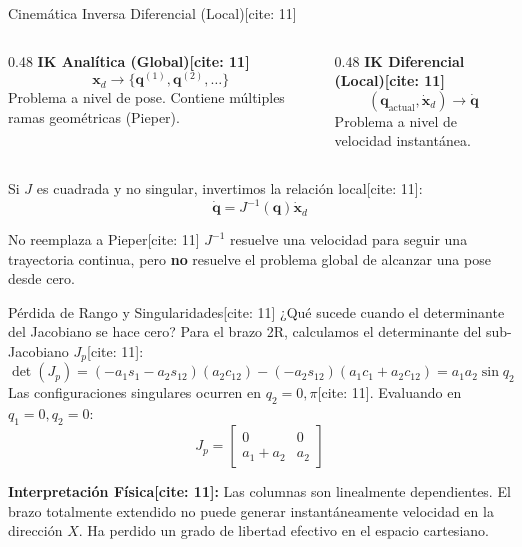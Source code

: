 \documentclass[aspectratio=169, xcolor={table,xcdraw}]{beamer}
\begin{document}
\begin{frame}{Cinemática Inversa Diferencial (Local)[cite: 11]}
    \begin{columns}[T]
        \begin{column}{0.48\textwidth}
            \textbf{IK Analítica (Global)[cite: 11]}
            \begin{equation*}
                \mathbf{x}_d \longrightarrow \{ \mathbf{q}^{(1)}, \mathbf{q}^{(2)}, \ldots \}
            \end{equation*}
            Problema a nivel de pose. Contiene múltiples ramas geométricas (Pieper).
        \end{column}
        \begin{column}{0.48\textwidth}
            \textbf{IK Diferencial (Local)[cite: 11]}
            \begin{equation*}
                ( \mathbf{q}_{\text{actual}}, \dot{\mathbf{x}}_d ) \longrightarrow \dot{\mathbf{q}}
            \end{equation*}
            Problema a nivel de velocidad instantánea.
        \end{column}
    \end{columns}
    
    \vfill
    Si $J$ es cuadrada y no singular, invertimos la relación local[cite: 11]:
    \begin{equation*}
        \boxed{\dot{\mathbf{q}} = J^{-1}(\mathbf{q})\dot{\mathbf{x}}_d}
    \end{equation*}
    
    \begin{alertblock}{No reemplaza a Pieper[cite: 11]}
        $J^{-1}$ resuelve una velocidad para seguir una trayectoria continua, pero \textbf{no} resuelve el problema global de alcanzar una pose desde cero.
    \end{alertblock}
\end{frame}

\begin{frame}{Pérdida de Rango y Singularidades[cite: 11]}
    ¿Qué sucede cuando el determinante del Jacobiano se hace cero?
    Para el brazo 2R, calculamos el determinante del sub-Jacobiano $J_p$[cite: 11]:
    \begin{equation*}
        \det(J_p) = (-a_1 s_1 - a_2 s_{12})(a_2 c_{12}) - (-a_2 s_{12})(a_1 c_1 + a_2 c_{12}) = \boxed{a_1 a_2 \sin q_2}
    \end{equation*}
    Las configuraciones singulares ocurren en $q_2 = 0, \pi$[cite: 11]. Evaluando en $q_1=0, q_2=0$:
    \begin{equation*}
        J_p = \begin{bmatrix} 0 & 0 \\ a_1+a_2 & a_2 \end{bmatrix}
    \end{equation*}
    
    \textbf{Interpretación Física[cite: 11]:}
    Las columnas son linealmente dependientes. El brazo totalmente extendido no puede generar instantáneamente velocidad en la dirección $X$. Ha perdido un grado de libertad efectivo en el espacio cartesiano.
\end{frame}
\end{document}
